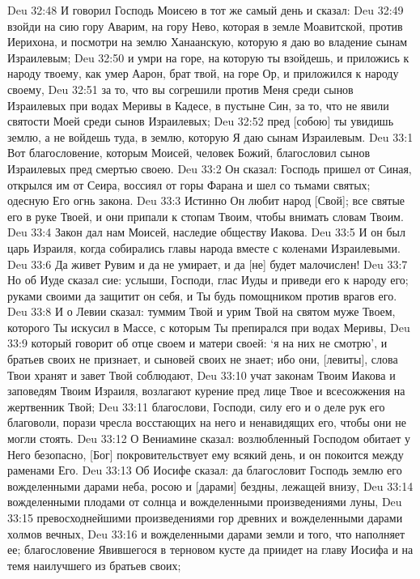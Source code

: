 Deu 32:48  И говорил Господь Моисею в тот же самый день и сказал:
Deu 32:49  взойди на сию гору Аварим, на гору Нево, которая в земле Моавитской, против Иерихона, и посмотри на землю Ханаанскую, которую я даю во владение сынам Израилевым;
Deu 32:50  и умри на горе, на которую ты взойдешь, и приложись к народу твоему, как умер Аарон, брат твой, на горе Ор, и приложился к народу своему,
Deu 32:51  за то, что вы согрешили против Меня среди сынов Израилевых при водах Меривы в Кадесе, в пустыне Син, за то, что не явили святости Моей среди сынов Израилевых;
Deu 32:52  пред [собою] ты увидишь землю, а не войдешь туда, в землю, которую Я даю сынам Израилевым.
Deu 33:1  Вот благословение, которым Моисей, человек Божий, благословил сынов Израилевых пред смертью своею.
Deu 33:2  Он сказал: Господь пришел от Синая, открылся им от Сеира, воссиял от горы Фарана и шел со тьмами святых; одесную Его огнь закона.
Deu 33:3  Истинно Он любит народ [Свой]; все святые его в руке Твоей, и они припали к стопам Твоим, чтобы внимать словам Твоим.
Deu 33:4  Закон дал нам Моисей, наследие обществу Иакова.
Deu 33:5  И он был царь Израиля, когда собирались главы народа вместе с коленами Израилевыми.
Deu 33:6  Да живет Рувим и да не умирает, и да [не] будет малочислен!
Deu 33:7  Но об Иуде сказал сие: услыши, Господи, глас Иуды и приведи его к народу его; руками своими да защитит он себя, и Ты будь помощником против врагов его.
Deu 33:8  И о Левии сказал: туммим Твой и урим Твой на святом муже Твоем, которого Ты искусил в Массе, с которым Ты препирался при водах Меривы,
Deu 33:9  который говорит об отце своем и матери своей: `я на них не смотрю', и братьев своих не признает, и сыновей своих не знает; ибо они, [левиты], слова Твои хранят и завет Твой соблюдают,
Deu 33:10  учат законам Твоим Иакова и заповедям Твоим Израиля, возлагают курение пред лице Твое и всесожжения на жертвенник Твой;
Deu 33:11  благослови, Господи, силу его и о деле рук его благоволи, порази чресла восстающих на него и ненавидящих его, чтобы они не могли стоять.
Deu 33:12  О Вениамине сказал: возлюбленный Господом обитает у Него безопасно, [Бог] покровительствует ему всякий день, и он покоится между раменами Его.
Deu 33:13  Об Иосифе сказал: да благословит Господь землю его вожделенными дарами неба, росою и [дарами] бездны, лежащей внизу,
Deu 33:14  вожделенными плодами от солнца и вожделенными произведениями луны,
Deu 33:15  превосходнейшими произведениями гор древних и вожделенными дарами холмов вечных,
Deu 33:16  и вожделенными дарами земли и того, что наполняет ее; благословение Явившегося в терновом кусте да приидет на главу Иосифа и на темя наилучшего из братьев своих;
